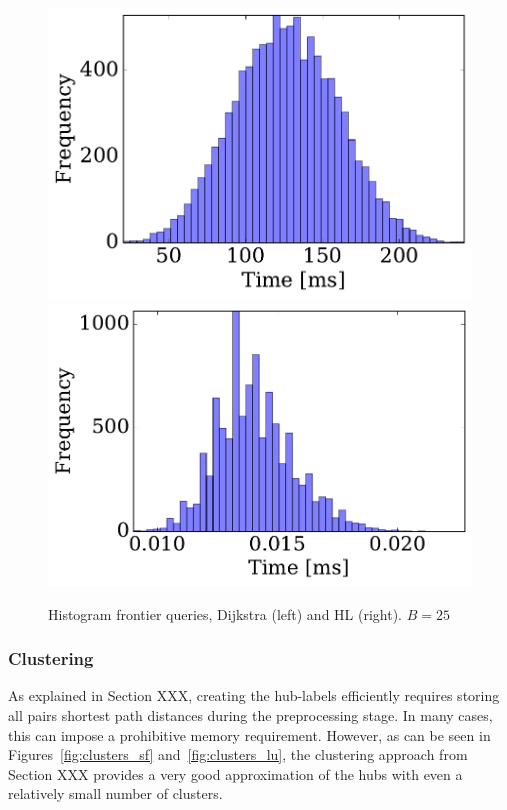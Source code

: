 \begin{figure}
\begin{center}
\includegraphics[clip, trim=0.2cm 0.3cm 0.2cm 0.2cm,scale=0.29]{TexImg/SF_query_dij_B25.pdf}
\includegraphics[clip, trim=1cm 0.3cm 0.2cm 0.2cm,scale=0.29]{TexImg/SF_query_hl_B25.pdf}
\end{center}
\caption{Histogram frontier queries, Dijkstra (left) and HL (right). $B=25$}\label{fig:SF_query}
\end{figure}


\subsubsection{Clustering}

As explained in Section XXX, creating the hub-labels efficiently requires storing all pairs shortest path distances during the preprocessing stage. In many cases, this can impose a prohibitive memory requirement. However, as can be seen in Figures~\ref{fig:clusters_sf} and~\ref{fig:clusters_lu}, the clustering approach from Section XXX provides a very good approximation of the hubs with even a relatively small number of clusters. 

